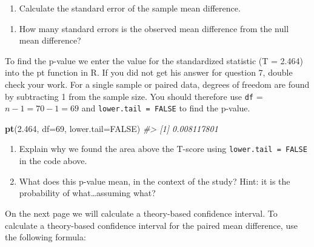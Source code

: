 \documentclass[
]{report}
\newenvironment{Shaded}{\begin{snugshade}}{\end{snugshade}}
\newcommand{\AttributeTok}[1]{\textcolor[rgb]{0.13,0.29,0.53}{#1}}
\newcommand{\CommentTok}[1]{\textcolor[rgb]{0.56,0.35,0.01}{\textit{#1}}}
\newcommand{\ConstantTok}[1]{\textcolor[rgb]{0.56,0.35,0.01}{#1}}
\newcommand{\DecValTok}[1]{\textcolor[rgb]{0.00,0.00,0.81}{#1}}
\newcommand{\FloatTok}[1]{\textcolor[rgb]{0.00,0.00,0.81}{#1}}
\newcommand{\FunctionTok}[1]{\textcolor[rgb]{0.13,0.29,0.53}{\textbf{#1}}}
\newcommand{\NormalTok}[1]{#1}
\providecommand{\tightlist}{%
  \setlength{\itemsep}{0pt}\setlength{\parskip}{0pt}}
\begin{document}
\begin{enumerate}
\def\labelenumi{\arabic{enumi}.}
\setcounter{enumi}{5}
\tightlist
\item
  Calculate the standard error of the sample mean difference.
\end{enumerate}

\vspace{0.5in}

\begin{enumerate}
\def\labelenumi{\arabic{enumi}.}
\setcounter{enumi}{6}
\tightlist
\item
  How many standard errors is the observed mean difference from the null mean difference?
\end{enumerate}

\vspace{0.5in}

To find the p-value we enter the value for the standardized statistic (T = 2.464) into the pt function in R. If you did not get his answer for question 7, double check your work. For a single sample or paired data, degrees of freedom are found by subtracting 1 from the sample size. You should therefore use \texttt{df} = \(n-1 = 70 - 1 = 69\) and \texttt{lower.tail\ =\ FALSE} to find the p-value.

\begin{Shaded}
\begin{Highlighting}[]
\FunctionTok{pt}\NormalTok{(}\FloatTok{2.464}\NormalTok{, }\AttributeTok{df=}\DecValTok{69}\NormalTok{, }\AttributeTok{lower.tail=}\ConstantTok{FALSE}\NormalTok{)}
\CommentTok{\#\textgreater{} [1] 0.008117801}
\end{Highlighting}
\end{Shaded}

\begin{enumerate}
\def\labelenumi{\arabic{enumi}.}
\setcounter{enumi}{7}
\item
  Explain why we found the area above the T-score using \texttt{lower.tail\ =\ FALSE} in the code above.
  \vspace{0.3in}
\item
  What does this p-value mean, in the context of the study? Hint: it is the probability of what\ldots assuming what?
  \vspace{1in}
\end{enumerate}

On the next page we will calculate a theory-based confidence interval. To calculate a theory-based confidence interval for the paired mean difference, use the following formula:
\end{document}
